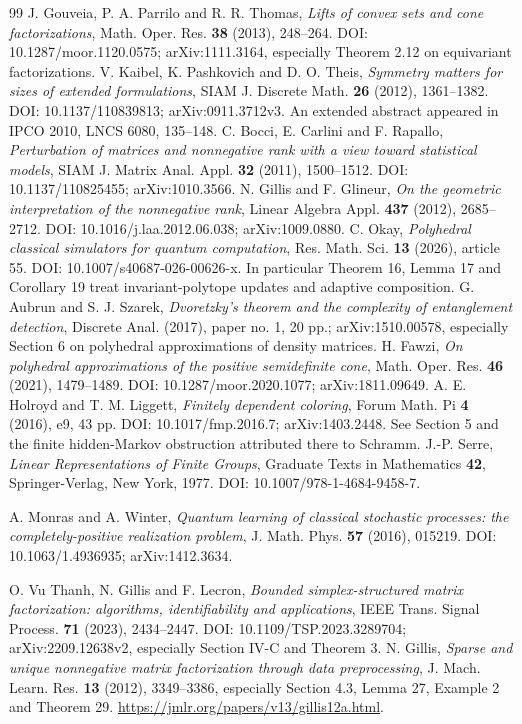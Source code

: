 \begin{thebibliography}{99}
 J. Gouveia, P. A. Parrilo and R. R. Thomas,
\emph{Lifts of convex sets and cone factorizations}, Math. Oper. Res.
\textbf{38} (2013), 248--264. DOI: 10.1287/moor.1120.0575;
arXiv:1111.3164, especially Theorem 2.12 on equivariant factorizations.
 V. Kaibel, K. Pashkovich and D. O. Theis,
\emph{Symmetry matters for sizes of extended formulations},
SIAM J. Discrete Math. \textbf{26} (2012), 1361--1382.
DOI: 10.1137/110839813; arXiv:0911.3712v3.
An extended abstract appeared in IPCO 2010, LNCS 6080, 135--148.
 C. Bocci, E. Carlini and F. Rapallo,
\emph{Perturbation of matrices and nonnegative rank with a view toward
statistical models}, SIAM J. Matrix Anal. Appl. \textbf{32} (2011),
1500--1512. DOI: 10.1137/110825455; arXiv:1010.3566.
 N. Gillis and F. Glineur,
\emph{On the geometric interpretation of the nonnegative rank},
Linear Algebra Appl. \textbf{437} (2012), 2685--2712.
DOI: 10.1016/j.laa.2012.06.038; arXiv:1009.0880.
 C. Okay, \emph{Polyhedral classical simulators for quantum
computation}, Res. Math. Sci. \textbf{13} (2026), article 55.
DOI: 10.1007/s40687-026-00626-x. In particular Theorem 16, Lemma 17
and Corollary 19 treat invariant-polytope updates and adaptive composition.
 G. Aubrun and S. J. Szarek,
\emph{Dvoretzky's theorem and the complexity of entanglement detection},
Discrete Anal. (2017), paper no. 1, 20 pp.; arXiv:1510.00578,
especially Section 6 on polyhedral approximations of density matrices.
 H. Fawzi,
\emph{On polyhedral approximations of the positive semidefinite cone},
Math. Oper. Res. \textbf{46} (2021), 1479--1489.
DOI: 10.1287/moor.2020.1077; arXiv:1811.09649.
 A. E. Holroyd and T. M. Liggett,
\emph{Finitely dependent coloring}, Forum Math. Pi \textbf{4} (2016),
e9, 43 pp. DOI: 10.1017/fmp.2016.7; arXiv:1403.2448.
See Section 5 and the finite hidden-Markov obstruction attributed there
to Schramm.
 J.-P. Serre, \emph{Linear Representations of Finite Groups},
Graduate Texts in Mathematics \textbf{42}, Springer-Verlag, New York, 1977.
DOI: 10.1007/978-1-4684-9458-7.

 A. Monras and A. Winter,
\emph{Quantum learning of classical stochastic processes: the
completely-positive realization problem}, J. Math. Phys. \textbf{57}
(2016), 015219. DOI: 10.1063/1.4936935; arXiv:1412.3634.

 O. Vu Thanh, N. Gillis and F. Lecron,
\emph{Bounded simplex-structured matrix factorization: algorithms,
identifiability and applications}, IEEE Trans. Signal Process.
\textbf{71} (2023), 2434--2447.
DOI: 10.1109/TSP.2023.3289704; arXiv:2209.12638v2,
especially Section IV-C and Theorem 3.
 N. Gillis,
\emph{Sparse and unique nonnegative matrix factorization through data
preprocessing}, J. Mach. Learn. Res. \textbf{13} (2012), 3349--3386,
especially Section 4.3, Lemma 27, Example 2 and Theorem 29.
\url{https://jmlr.org/papers/v13/gillis12a.html}.


\end{thebibliography}
